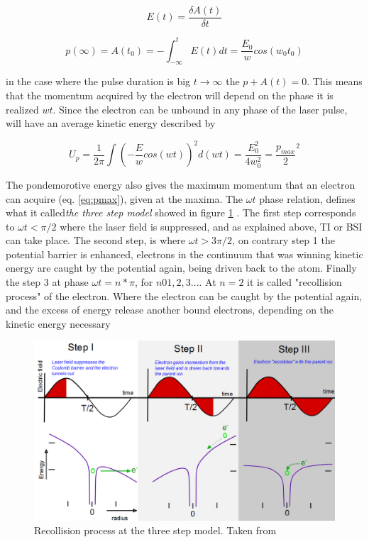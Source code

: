 \begin{equation}
E(t) = \dfrac{\delta A(t)}{\delta t}
\end{equation}

\begin{equation}
p(\infty) = A(t_{0}) = -\int_{-\infty}^{t} E(t) dt = \dfrac{E_{0}}{w} cos(w_{0}t_{0})
\label{eq:pmax}
\end{equation}

in the case where the pulse  duration is big $t \longrightarrow \infty$ the $p + A(t) = 0$. This means that the momentum acquired by the electron will depend on the phase it is realized $wt$. Since the electron can be unbound in any phase of the laser pulse, will have an average kinetic energy described by

\begin{equation} 
U_{p} = \dfrac{1}{2\pi} \int (-\dfrac{E}{w} cos (wt))^{2}d(wt) = \dfrac{E^{2}_{0}}{4w^{2}_{0}} = \dfrac{p_{max}}{2}^{2}
\label{eq:pondeenergy}
\end{equation}

The pondemorotive energy also gives the maximum momentum that an electron can acquire (eq. \ref{eq:pmax}), given at the maxima. The $\omega t$ phase relation, defines what it called\textit{the three step model} showed in figure \ref{fig:ponder} . The first step corresponds to $\omega t < \pi /2$ where the laser field is suppressed, and as explained above, TI or BSI can take place. The second step, is where $\omega t > 3\pi /2$, on contrary step 1 the potential barrier is enhanced, electrons in the continuum that was winning kinetic energy are caught by the potential again, being driven  back to the atom. Finally the step 3 at phase $\omega t = n* \pi$, for $n 0 1,2,3...$. At $n=2$ it is called "recollision process" of the electron. Where the electron can be caught by the potential again, and the excess of energy release another bound electrons, depending on the kinetic energy necessary \cite{krishnan_ignition_2012}

\begin{figure}[h!]\label{fig:ponder}
\centering
\includegraphics[width=12 cm]{../Images/ponderomotive steps.png}
\caption[Ponderomotive 3 steps]{Recollision  process at the three step model. Taken from \cite{krishnan_doped_2011}}
\label{fig:ponder}
\end{figure}


